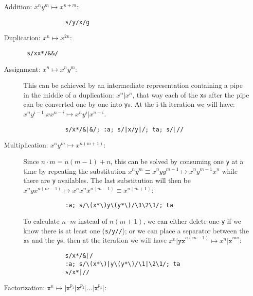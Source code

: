 \begin{description}
	\item[Addition: $x^ny^m\mapsto x^{n+m}$:]
		\begin{verbatim}
			s/y/x/g
		\end{verbatim}

	\item[Duplication: $x^n\mapsto x^{2n}$:]
		\begin{verbatim} s/xx*/&&/ \end{verbatim}

	\item[Assignment: $x^n\mapsto x^ny^m$:]

		This can be achieved by an intermediate representation containing a pipe in
		the middle of a duplication: $x^n\texttt{|}x^n$, that way each of the
		{\tt x}s after the pipe can be converted one by one into {\tt y}s.  At the
		i-th iteration we will have:
		$x^ny^{i-1}\texttt{|}xx^{n-i} \mapsto x^ny^i\texttt{|}x^{n-i}$.

		\begin{Verbatim}
			s/x*/&|&/; :a; s/|x/y|/; ta; s/|//
		\end{Verbatim}

	\item[Multiplication: $x^ny^m\mapsto x^{n(m+1)}$:]

		Since $n\cdot m=n(m-1)+n$, this can be solved by consuming one {\tt y}
		at a time by repeating the substitution $x^ny^m \equiv x^nyy^{m-1}
		\mapsto	x^ny^{m-1}x^n$ while there are {\tt y} availables.  The last
		substitution will then be $x^nyx^{n(m-1)} \mapsto x^nx^nx^{n(m-1)}
		\equiv x^{n(m+1)}$:

		\begin{Verbatim}
			:a; s/\(x*\)y\(y*\)/\1\2\1/; ta
		\end{Verbatim}

		To calculate $n\cdot m$ instead of $n(m+1)$, we can either delete one
		{\tt y} if we know there is at least one (\verb|s/y//|); or we can place
		a separator between the {\tt x}s and the {\tt y}s, then at the iteration
		we will have $x^n\texttt{|yx}^{n(m-1)} \mapsto x^n\texttt{|x}^{nm}$:

		\begin{Verbatim}
			s/x*/&|/
			:a; s/\(x*\)|y\(y*\)/\1|\2\1/; ta
			s/x*|//
		\end{Verbatim}

	\item[Factorization: $\texttt{x}^n \mapsto
		\texttt{|x}^{p_1}\texttt{|x}^{p_2}\texttt{|}
		\ldots\texttt{|x}^{p_k}\texttt{|}$:]


\end{description}
